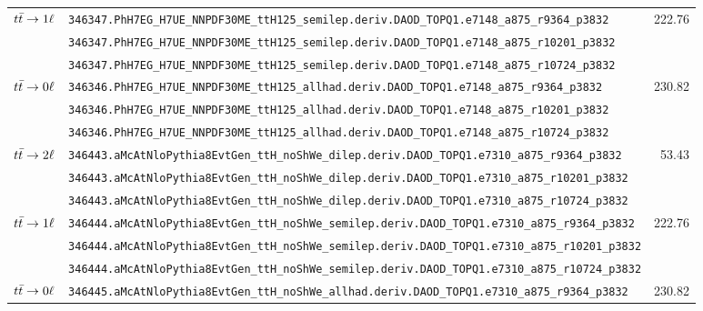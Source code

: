 \begin{table}[htbp]
{\begin{tabular}{l|l|r}
\multirow{3}{*}{$t\bar{t}\to\mathrm{1\ell}$}     & \verb|346347.PhH7EG_H7UE_NNPDF30ME_ttH125_semilep.deriv.DAOD_TOPQ1.e7148_a875_r9364_p3832|  & \multirow{3}{*}{222.76} \\
                                               & \verb|346347.PhH7EG_H7UE_NNPDF30ME_ttH125_semilep.deriv.DAOD_TOPQ1.e7148_a875_r10201_p3832| &  \\
                                               & \verb|346347.PhH7EG_H7UE_NNPDF30ME_ttH125_semilep.deriv.DAOD_TOPQ1.e7148_a875_r10724_p3832| &  \\ \hline
\multirow{3}{*}{$t\bar{t}\to\mathrm{0\ell}$}     & \verb|346346.PhH7EG_H7UE_NNPDF30ME_ttH125_allhad.deriv.DAOD_TOPQ1.e7148_a875_r9364_p3832|   & \multirow{3}{*}{230.82} \\
                                               & \verb|346346.PhH7EG_H7UE_NNPDF30ME_ttH125_allhad.deriv.DAOD_TOPQ1.e7148_a875_r10201_p3832|  &  \\
                                               & \verb|346346.PhH7EG_H7UE_NNPDF30ME_ttH125_allhad.deriv.DAOD_TOPQ1.e7148_a875_r10724_p3832|  &  \\ \hline
\hline
\multirow{3}{*}{$t\bar{t}\to\mathrm{2\ell}$}     & \verb|346443.aMcAtNloPythia8EvtGen_ttH_noShWe_dilep.deriv.DAOD_TOPQ1.e7310_a875_r9364_p3832|    & \multirow{3}{*}{53.43} \\
                                               & \verb|346443.aMcAtNloPythia8EvtGen_ttH_noShWe_dilep.deriv.DAOD_TOPQ1.e7310_a875_r10201_p3832|   &  \\
                                               & \verb|346443.aMcAtNloPythia8EvtGen_ttH_noShWe_dilep.deriv.DAOD_TOPQ1.e7310_a875_r10724_p3832|   &  \\ \hline
\multirow{3}{*}{$t\bar{t}\to\mathrm{1\ell}$}     & \verb|346444.aMcAtNloPythia8EvtGen_ttH_noShWe_semilep.deriv.DAOD_TOPQ1.e7310_a875_r9364_p3832|  & \multirow{3}{*}{222.76} \\
                                               & \verb|346444.aMcAtNloPythia8EvtGen_ttH_noShWe_semilep.deriv.DAOD_TOPQ1.e7310_a875_r10201_p3832| &  \\
                                               & \verb|346444.aMcAtNloPythia8EvtGen_ttH_noShWe_semilep.deriv.DAOD_TOPQ1.e7310_a875_r10724_p3832| &  \\ \hline
\multirow{3}{*}{$t\bar{t}\to\mathrm{0\ell}$}     & \verb|346445.aMcAtNloPythia8EvtGen_ttH_noShWe_allhad.deriv.DAOD_TOPQ1.e7310_a875_r9364_p3832|   & \multirow{3}{*}{230.82} \\

\end{tabular}}
\end{table}
